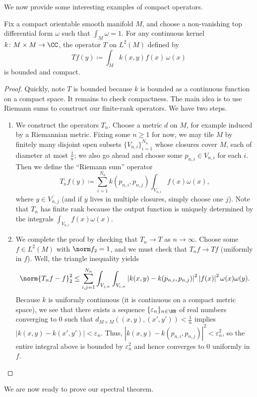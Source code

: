 \documentclass{amsart}
\begin{document}
We now provide some interesting examples of compact operators.
\begin{lemma} \label{lem:convolution-is-compact}
	Fix a compact orientable smooth manifold $M$, and choose a non-vanishing top differential form $\omega$ such that $\int_M\omega=1$. For any continuous kernel $k\colon M\times M\to\CC$, the operator $T$ on $L^2(M)$ defined by
	\[Tf(y)\coloneqq\int_Mk(x,y)f(x)\,\omega(x)\]
	is bounded and compact.
\end{lemma}
\begin{proof}
	Quickly, note $T$ is bounded because $k$ is bounded as a continuous function on a compact space. It remains to check compactness. The main idea is to use Riemann sums to construct our finite-rank operators.
	We have two steps.
	\begin{enumerate}
		\item We construct the operators $T_n$. Choose a metric $d$ on $M$, for example induced by a Riemannian metric. Fixing some $n\ge1$ for now, we may tile $M$ by finitely many disjoint open subsets $\{V_{n,i}\}_{i=1}^{N_n}$ whose closures cover $M$, each of diameter at most $\frac1n$; we also go ahead and choose some $p_{n,i}\in V_{n,i}$ for each $i$. Then we define the ``Riemann sum'' operator
		\[T_nf(y)\coloneqq\sum_{i=1}^{N_n}k(p_{n,i},p_{n,j})\int_{V_{n,i}}f(x)\omega(x),\]
		where $y\in\overline{V_{n,j}}$ (and if $y$ lives in multiple closures, simply choose one $j$). Note that $T_n$ has finite rank because the output function is uniquely determined by the integrals $\int_{V_{n,i}}f(x)\omega(x)$.
		\item We complete the proof by checking that $T_n\to T$ as $n\to\infty$. Choose some $f\in L^2(M)$ with $\norm f_2=1$, and we must check that $T_nf\to Tf$ (uniformly in $f$). Well, the triangle inequality yields
		\[\norm{T_nf-f}_2^2\le\sum_{i,j=1}^{N_n}\int_{V_{j,n}}\int_{V_{i,n}}\left|k(x,y)-k(p_{n,i},p_{n,j})\right|^2\left|f(x)\right|^2\omega(x)\omega(y).\]
		Because $k$ is uniformly continuous (it is continuous on a compact metric space), we see that there exists a sequence $\{\varepsilon_n\}_{n\in\NN}$ of real numbers converging to $0$ such that $d_{M\times M}((x,y),(x',y'))<\frac1n$ implies $\left|k(x,y)-k(x',y')\right|<\varepsilon_n$. Thus, $\left|k(x,y)-k(p_{n,i},p_{n,j})\right|^2<\varepsilon_n^2$, so the entire integral above is bounded by $\varepsilon_n^2$ and hence converges to $0$ uniformly in $f$.
		\qedhere
	\end{enumerate}
\end{proof}
We are now ready to prove our spectral theorem.
\end{document}
